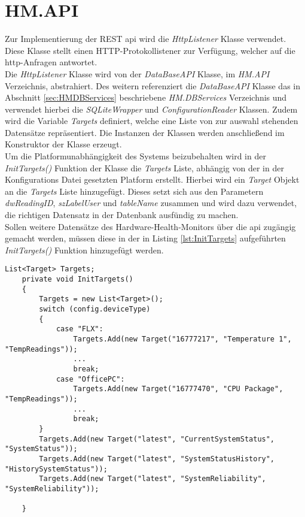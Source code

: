 \newpage
\section{HM.API}
Zur Implementierung der REST \ac{api} wird die \textit{HttpListener} Klasse verwendet. Diese Klasse stellt einen HTTP-Protokollistener zur Verfügung, welcher auf die \ac{http}-Anfragen antwortet. \cite{HttpListener}\\
Die \textit{HttpListener} Klasse wird von der \textit{DataBaseAPI} Klasse, im \textit{HM.API} Verzeichnis, abstrahiert. Des weitern referenziert die \textit{DataBaseAPI} Klasse das in Abschnitt \ref{sec:HMDBServices} beschriebene \textit{HM.DBServices} Verzeichnis und verwendet hierbei die \textit{SQLiteWrapper} und \textit{ConfigurationReader} Klassen. Zudem wird die Variable \textit{Targets} definiert, welche eine Liste von zur auswahl stehenden Datensätze repräsentiert. Die Instanzen der Klassen werden anschließend im Konstruktor der Klasse erzeugt.\\
Um die Platformunabhängigkeit des Systems beizubehalten wird in der \textit{InitTargets()} Funktion der Klasse die \textit{Targets} Liste, abhängig von der in der Konfigurations Datei gesetzten Platform erstellt. Hierbei wird ein \textit{Target} Objekt an die \textit{Targets} Liste hinzugefügt. Dieses setzt sich aus den Parametern \textit{dwReadingID}, \textit{szLabelUser} und \textit{tableName} zusammen und wird dazu verwendet, die richtigen Datensatz in der Datenbank ausfündig zu machen.\\
Sollen weitere Datensätze des Hardware-Health-Monitors über die \ac{api} zugängig gemacht werden, müssen diese in der in Listing \ref{lst:InitTargets} aufgeführten \textit{InitTargets()} Funktion hinzugefügt werden. 
\begin{lstlisting}[caption={InitTargets Funktino der DataBaseAPI}, label={lst:InitTargets}]
    List<Target> Targets;
    private void InitTargets()
    {
        Targets = new List<Target>();
        switch (config.deviceType)
        {
            case "FLX":
                Targets.Add(new Target("16777217", "Temperature 1", "TempReadings"));
                ...
                break;
            case "OfficePC":
                Targets.Add(new Target("16777470", "CPU Package", "TempReadings"));
                ...
                break;
        }
        Targets.Add(new Target("latest", "CurrentSystemStatus", "SystemStatus"));
        Targets.Add(new Target("latest", "SystemStatusHistory", "HistorySystemStatus"));
        Targets.Add(new Target("latest", "SystemReliability", "SystemReliability"));

    }
\end{lstlisting}
